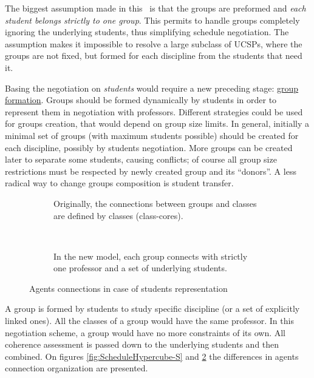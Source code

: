\documentclass[header]{subfiles}
\providecommand{\rootdir}{.}
\begin{document}
The biggest assumption made in this \thisdoc\ is that the groups are preformed
and \emph{each student belongs strictly to one group}. This permits to handle
groups completely ignoring the underlying students, thus simplifying schedule
negotiation.
The assumption makes it impossible to resolve a large subclass of UCSPs, where
the groups are not fixed, but formed for each discipline from the students
that need it.

Basing the negotiation on \emph{students} would require a new preceding stage:
\underline{group formation}. Groups should be formed dynamically by students in
order to represent them in negotiation with professors. Different strategies
could be used for groups creation, that would depend on group size limits.
In general, initially a minimal set of groups (with maximum students possible)
should be created for each discipline, possibly by students negotiation.
More groups can be created later to separate some students, causing conflicts;
of course all group size restrictions must be respected by newly created
group and its ``donors''. A less radical way to change groups composition is
student transfer.


\begin{figure}[H]
  \begin{subfigure}{0.36\textwidth}
    \resizebox{\linewidth}{!}{
      
    }
    \caption{Originally, the connections between groups and classes are
             defined by classes (class-cores).}
  \end{subfigure}
  ~
  \begin{subfigure}{0.64\textwidth}
    \resizebox{\linewidth}{!}{
      
    }
    \caption{In the new model, each group connects with strictly one professor
             and a set of underlying students.}
    \label{}
  \end{subfigure}
  \caption{Agents connections in case of students representation}
  \label{fig:ConnectionMatrixDiff}
\end{figure}


A group is formed by students to study specific discipline (or a set of
explicitly linked ones). All the classes of a group would have the same professor.
In this negotiation scheme, a group would have no more constraints of its own.
All coherence assessment is passed down to the underlying students and then
combined. On figures \ref{fig:ScheduleHypercube-S} and
\ref{fig:ConnectionMatrixDiff} the differences in agents connection organization
are presented.
\end{document}
